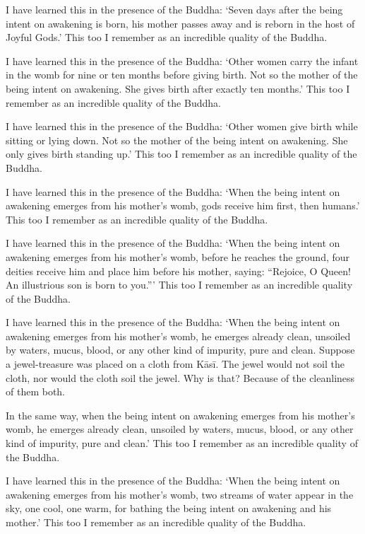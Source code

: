 \documentclass[12pt,openany]{book}%
\begin{document}
I have learned this in the presence of the Buddha: ‘Seven days after the being intent on awakening is born, his mother passes away and is reborn in the host of Joyful Gods.’ This too I remember as an incredible quality of the Buddha. 

I have learned this in the presence of the Buddha: ‘Other women carry the infant in the womb for nine or ten months before giving birth. Not so the mother of the being intent on awakening. She gives birth after exactly ten months.’ This too I remember as an incredible quality of the Buddha. 

I have learned this in the presence of the Buddha: ‘Other women give birth while sitting or lying down. Not so the mother of the being intent on awakening. She only gives birth standing up.’ This too I remember as an incredible quality of the Buddha. 

I have learned this in the presence of the Buddha: ‘When the being intent on awakening emerges from his mother’s womb, gods receive him first, then humans.’ This too I remember as an incredible quality of the Buddha. 

I have learned this in the presence of the Buddha: ‘When the being intent on awakening emerges from his mother’s womb, before he reaches the ground, four deities receive him and place him before his mother, saying: “Rejoice, O Queen! An illustrious son is born to you.”’ This too I remember as an incredible quality of the Buddha. 

I have learned this in the presence of the Buddha: ‘When the being intent on awakening emerges from his mother’s womb, he emerges already clean, unsoiled by waters, mucus, blood, or any other kind of impurity, pure and clean. Suppose a jewel-treasure was placed on a cloth from \textsanskrit{Kāsī}. The jewel would not soil the cloth, nor would the cloth soil the jewel. Why is that? Because of the cleanliness of them both. 

In the same way, when the being intent on awakening emerges from his mother’s womb, he emerges already clean, unsoiled by waters, mucus, blood, or any other kind of impurity, pure and clean.’ This too I remember as an incredible quality of the Buddha. 

I have learned this in the presence of the Buddha: ‘When the being intent on awakening emerges from his mother’s womb, two streams of water appear in the sky, one cool, one warm, for bathing the being intent on awakening and his mother.’ This too I remember as an incredible quality of the Buddha. 
\end{document}
